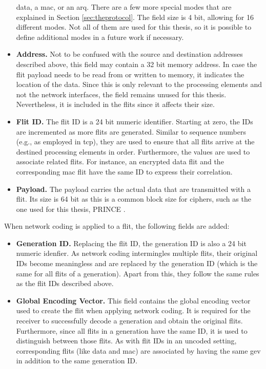 \begin{itemize}
        data, a \gls{mac}, or an \gls{arq}. There are a few more special modes that are explained in Section \ref{sec:theprotocol}. The
        field size is 4 bit, allowing for 16 different modes. Not all of them are used for this thesis, so it is possible to define additional modes
        in a future work if necessary.
    \item \textbf{Address.} Not to be confused with the source and destination addresses described above, this field may contain a 32 bit memory
        address. In case the flit payload needs to be read from or written to memory, it indicates the location of the data. Since this is only
        relevant to the processing elements and not the network interfaces, the field remains unused for this thesis. Nevertheless, it is included in
        the flits since it affects their size.
    \item \textbf{Flit ID.} The flit ID is a 24 bit numeric identifier. Starting at zero, the IDs are incremented as more flits are generated.
        Similar to sequence numbers (e.g., as employed in \gls{tcp}), they are used to ensure that all flits arrive at the destined processing
        elements in order. Furthermore, the values are used to associate related flits. For instance, an encrypted data flit and the corresponding \gls{mac}
        flit have the same ID to express their correlation.
    \item \textbf{Payload.} The payload carries the actual data that are transmitted with a flit. Its size is 64 bit as this is a common block size
        for ciphers, such as the one used for this thesis, PRINCE \cite{borghoff12prince}.
\end{itemize}
\vspace{0.5\baselineskip}

When network coding is applied to a flit, the following fields are added:
\begin{itemize}
    \item \textbf{Generation ID.} Replacing the flit ID, the generation ID is also a 24 bit numeric idenfier. As network coding intermingles multiple
        flits, their original IDs become meaningless and are replaced by the generation ID (which is the same for all flits of a generation). Apart
        from this, they follow the same rules as the flit IDs described above.
    \item \textbf{Global Encoding Vector.} This field contains the global encoding vector used to create the flit when applying network coding. It is
        required for the receiver to successfully decode a generation and obtain the original flits. Furthermore, since all flits in a generation have
        the same ID, it is used to distinguish between those flits. As with flit IDs in an uncoded setting, corresponding flits (like data and
        \gls{mac}) are associated by having the same \gls{gev} in addition to the same generation ID.
\end{itemize}
\vspace{0.5\baselineskip}

